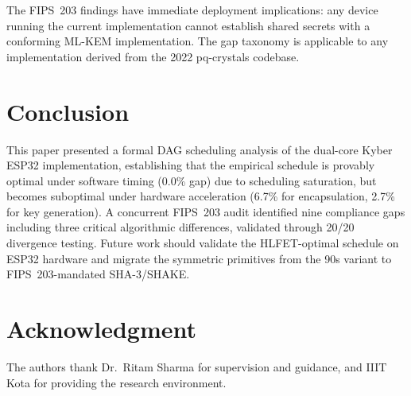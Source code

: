\documentclass[conference]{IEEEtran}
\begin{document}
The FIPS~203 findings have immediate deployment implications: any device running the current implementation cannot establish shared secrets with a conforming ML-KEM implementation. The gap taxonomy is applicable to any implementation derived from the 2022 pq-crystals codebase.

\section{Conclusion}

This paper presented a formal DAG scheduling analysis of the dual-core Kyber ESP32 implementation, establishing that the empirical schedule is provably optimal under software timing (0.0\% gap) due to scheduling saturation, but becomes suboptimal under hardware acceleration (6.7\% for encapsulation, 2.7\% for key generation). A concurrent FIPS~203 audit identified nine compliance gaps including three critical algorithmic differences, validated through 20/20 divergence testing. Future work should validate the HLFET-optimal schedule on ESP32 hardware and migrate the symmetric primitives from the 90s variant to FIPS~203-mandated SHA-3/SHAKE.

\section*{Acknowledgment}

The authors thank Dr.\ Ritam Sharma for supervision and guidance, and IIIT Kota for providing the research environment.
\end{document}
